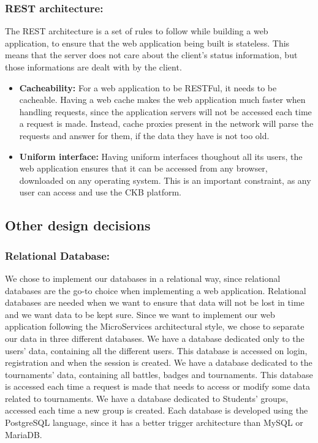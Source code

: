 \documentclass{article}
\begin{document}
{    \subsubsection{REST architecture:}
    The REST architecture is a set of rules to follow while building a web application, to ensure that the web application being built is stateless.
    This means that the server does not care about the client's status information, but those informations are dealt with by the client.
    \begin{itemize}
    \item \textbf{Cacheability:} For a web application to be RESTFul, it needs to be cacheable. Having a web cache makes the web application much faster when handling 
    requests, since the application servers will not be accessed each time a request is made. Instead, cache proxies present in the network will parse the requests and
     answer for them, if the data they have is not too old.
    \item \textbf{Uniform interface:} Having uniform interfaces thoughout all its users, the web application ensures that it can be accessed from any browser, downloaded
    on any operating system. This is an important constraint, as any user can access and use the CKB platform.
    \end{itemize}
\subsection{Other design decisions}
    \subsubsection{Relational Database:} We chose to implement our databases in a relational way, since relational databases are the go-to choice when 
    implementing a web application. Relational databases are needed when we want to ensure that data will not be lost in time and we want data to be kept sure.
    Since we want to implement our web application following the MicroServices architectural style, we chose to separate our data in three different databases.
    We have a database dedicated only to the users' data, containing all the different users. This database is accessed on login, registration and when the 
    session is created.
    We have a database dedicated to the tournaments' data, containing all battles, badges and tournaments. This database is accessed each time a request 
    is made that needs to access or modify some data related to tournaments.
    We have a database dedicated to Students' groups, accessed each time a new group is created.
    Each database is developed using the PostgreSQL language, since it has a better trigger architecture than MySQL or MariaDB.
}
\end{document}
